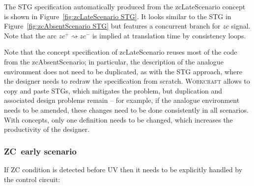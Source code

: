 \documentclass[british, journal]{IEEEtran}
\newcommand{\noun}[1]{\textsc{#1}}
\begin{document}
The STG specification automatically produced from the \textsf{zcLateScenario} concept
is shown in Figure~\ref{fig:zcLateScenario STG}. It looks similar to the STG in
Figure~\ref{fig:zcAbsentScenario STG} but features a concurrent branch for $zc$ signal.
Note that the arc $zc^{+}\rightsquigarrow zc^{-}$ is implied at translation
time by consistency loops.

Note that the concept specification of \textsf{zcLateScenario} reuses most of
the code from the \textsf{zcAbsentScenario}; in particular, the description of
the analogue environment does not need to be duplicated, as with the STG
approach, where the designer needs to redraw the specification from scratch.
\noun{Workcraft} allows to copy and paste STGs, which mitigates the problem,
but duplication and associated design problems remain -- for example, if
the analogue environment needs to be amended, these changes need to be done
consistently in all scenarios. With concepts, only one definition needs to be
changed, which increases the productivity of the designer.

\subsubsection{ZC~early scenario}

If ZC condition is detected before UV then it needs to be explicitly
handled by the control circuit:
\end{document}
